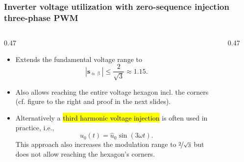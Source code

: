 \begin{frame}[b]
    \frametitle{Inverter voltage utilization with zero-sequence injection three-phase PWM}
    \begin{columns}[onlytextwidth]
        \begin{column}{0.47\textwidth}
            \begin{itemize}
                \item<2-> Extends the fundamental voltage range to $$|\bm{s}_{\upalpha\upbeta}| \leq \frac{2}{\sqrt{3}} \approx 1.15.$$
                \item<3-> Also allows reaching the entire voltage hexagon incl. the corners (cf. figure to the right and proof in the next slides).
                \item<4-> Alternatively a \hl{third harmonic voltage injection} is often used in practice, i.e., $$u_0(t) = \hat{u}_0 \sin\left(3\omega t\right).$$ This approach also increases the modulation range to $\nicefrac{2}{\sqrt{3}}$ but does not allow reaching the hexagon's corners.
            \end{itemize}
        \end{column}
        \begin{column}{0.47\textwidth}
            \centering
            \vspace{-0.25cm}
            \begin{figure}
\end{figure}
\end{column}
\end{columns}
\end{frame}
